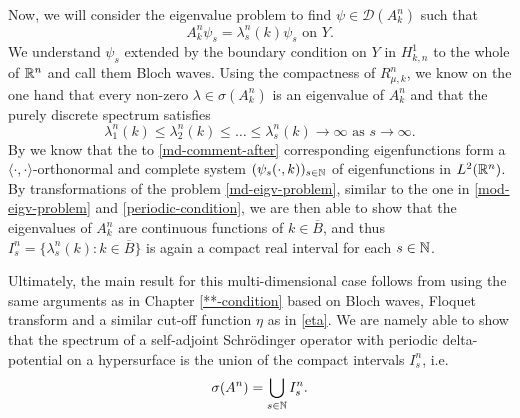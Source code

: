 Now, we will consider the eigenvalue problem to find $\psi \in \mathcal{D}(A^{n}_{k})$ such that
	\begin{equation}
		A^{n}_{k} \psi_{s} = \lambda^{n}_{s}(k) \psi_{s} \text{ on } Y. \label{md-eigv-problem}
	\end{equation}
We understand $\psi_{s}$ extended by the boundary condition on $Y$ in $H^{1}_{k, n}$ to the whole of $\mathbb{R}^{n}$ and call them Bloch waves. Using the compactness of $R_{\mu, k}^{n}$, we know on the one hand that every non-zero $\lambda \in \sigma(A_{k}^{n})$ is an eigenvalue of $A_{k}^{n}$ and that the purely discrete spectrum satisfies
	\begin{equation}
		\lambda^{n}_{1}(k) \leq \lambda^{n}_{2}(k) \leq \dotsc \leq \lambda^{n}_{s}(k) \rightarrow \infty \text{ as } s \rightarrow \infty. \label{md-comment-after}
	\end{equation}
By \cite[page 643 - 645]{evans1998partial} we know that the to \eqref{md-comment-after} corresponding eigenfunctions form a $\langle \cdot , \cdot \rangle$-orthonormal and complete system $(\psi_{s}(\cdot, k))_{s \in \mathbb{N}}$ of eigenfunctions in $L^{2}(\mathbb{R}^{n})$. By transformations of the problem \eqref{md-eigv-problem}, similar to the one in \eqref{mod-eigv-problem} and \eqref{periodic-condition}, we are then able to show that the eigenvalues of $A^{n}_{k}$ are continuous functions of $k \in \overline{B}$, and thus $I^{n}_{s} = \{ \lambda^{n}_{s}(k) : k \in \overline{B} \}$ is again a compact real interval for each $s \in \mathbb{N}$.
~\newline 

Ultimately, the main result for this multi-dimensional case follows from using the same arguments as in Chapter \ref{**-condition} based on Bloch waves, Floquet transform and a similar cut-off function $\eta$ as in \eqref{eta}. We are namely able to show that the spectrum of a self-adjoint Schrödinger operator with periodic delta-potential on a hypersurface is the union of the compact intervals $I^{n}_{s}$, i.e.
	\[ \sigma(A^{n}) = \bigcup_{s \in \mathbb{N}} I^{n}_{s}. \]